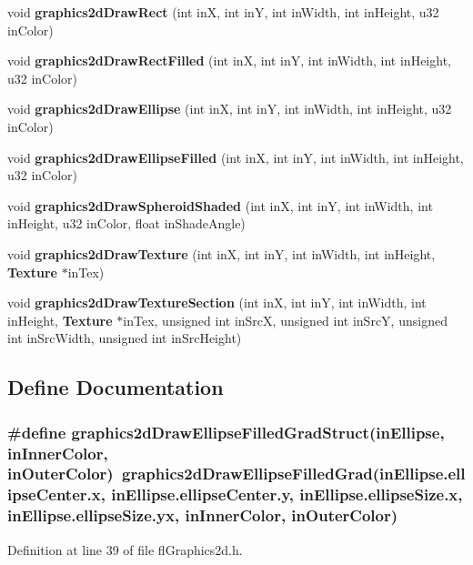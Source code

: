 \begin{CompactItemize}
\item 
void {\bf graphics2d\-Draw\-Rect} (int in\-X, int in\-Y, int in\-Width, int in\-Height, u32 in\-Color)
\item 
void {\bf graphics2d\-Draw\-Rect\-Filled} (int in\-X, int in\-Y, int in\-Width, int in\-Height, u32 in\-Color)
\item 
void {\bf graphics2d\-Draw\-Ellipse} (int in\-X, int in\-Y, int in\-Width, int in\-Height, u32 in\-Color)
\item 
void {\bf graphics2d\-Draw\-Ellipse\-Filled} (int in\-X, int in\-Y, int in\-Width, int in\-Height, u32 in\-Color)
\item 
void {\bf graphics2d\-Draw\-Spheroid\-Shaded} (int in\-X, int in\-Y, int in\-Width, int in\-Height, u32 in\-Color, float in\-Shade\-Angle)
\item 
void {\bf graphics2d\-Draw\-Texture} (int in\-X, int in\-Y, int in\-Width, int in\-Height, {\bf Texture} $\ast$in\-Tex)
\item 
void {\bf graphics2d\-Draw\-Texture\-Section} (int in\-X, int in\-Y, int in\-Width, int in\-Height, {\bf Texture} $\ast$in\-Tex, unsigned int in\-Src\-X, unsigned int in\-Src\-Y, unsigned int in\-Src\-Width, unsigned int in\-Src\-Height)
\end{CompactItemize}


\subsection{Define Documentation}
\subsubsection{\setlength{\rightskip}{0pt plus 5cm}\#define graphics2d\-Draw\-Ellipse\-Filled\-Grad\-Struct(in\-Ellipse, in\-Inner\-Color, in\-Outer\-Color)~graphics2d\-Draw\-Ellipse\-Filled\-Grad(in\-Ellipse.ellipse\-Center.x, in\-Ellipse.ellipse\-Center.y, in\-Ellipse.ellipse\-Size.x, in\-Ellipse.ellipse\-Size.yx, in\-Inner\-Color, in\-Outer\-Color)}\label{flGraphics2d_8h_6a88cfffa7cba84ce981ee092e80260a}




Definition at line 39 of file fl\-Graphics2d.h.
